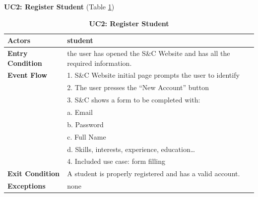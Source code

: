 \textbf{UC2: Register Student }(Table \ref{tab:UC2})
\begin{table}[H]
\centering
\caption{\textbf{UC2: Register Student}}
\label{tab:UC2}
\begin{tabularx}{\textwidth}{|X|X|}
\hline
\textbf{Actors}           & student                                                   \\ \hline
\textbf{Entry Condition}   & the user has opened the S\&C Website and has all the required information. \\ \hline
\textbf{Event Flow}        & 1. S\&C Website initial page prompts the user to identify  \\
                           & 2. The user presses the “New Account” button             \\
                           & 3. S\&C shows a form to be completed with:               \\
                           & \hspace{1em} a. Email                                      \\
                           & \hspace{1em} b. Password                                   \\
                           & \hspace{1em} c. Full Name                                 \\
                           & \hspace{1em} d. Skills, interests, experience, education… \\
                           & 4. Included use case: form filling                        \\ \hline
\textbf{Exit Condition}    & A student is properly registered and has a valid account. \\ \hline
\textbf{Exceptions}        & none                                                      \\ \hline
\end{tabularx}
\end{table}

